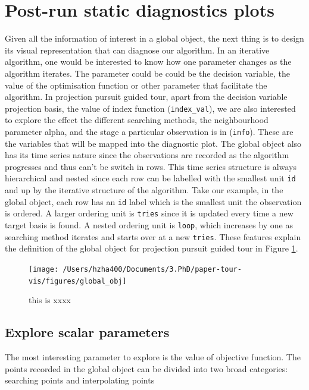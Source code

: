 \documentclass[12pt]{article}
\begin{document}
\hypertarget{post-run-static-diagnostics-plots}{%
\section{Post-run static diagnostics
plots}\label{post-run-static-diagnostics-plots}}

Given all the information of interest in a global object, the next thing
is to design its visual representation that can diagnose our algorithm.
In an iterative algorithm, one would be interested to know how one
parameter changes as the algorithm iterates. The parameter could be
could be the decision variable, the value of the optimisation function
or other parameter that facilitate the algorithm. In projection pursuit
guided tour, apart from the decision variable projection basis, the
value of index function (\texttt{index\_val}), we are also interested to
explore the effect the different searching methods, the neighbourhood
parameter alpha, and the stage a particular observation is in
(\texttt{info}). These are the variables that will be mapped into the
diagnostic plot. The global object also has its time series nature since
the observations are recorded as the algorithm progresses and thus can't
be switch in rows. This time series structure is always hierarchical and
nested since each row can be labelled with the smallest unit \texttt{id}
and up by the iterative structure of the algorithm. Take our example, in
the global object, each row has an \texttt{id} label which is the
smallest unit the observation is ordered. A larger ordering unit is
\texttt{tries} since it is updated every time a new target basis is
found. A nested ordering unit is \texttt{loop}, which increases by one
as searching method iterates and starts over at a new \texttt{tries}.
These features explain the definition of the global object for
projection pursuit guided tour in Figure \ref{fig:glb-obj}.

\begin{figure}
\texttt{[image: /Users/hzha400/Documents/3.PhD/paper-tour-vis/figures/global\_obj]} \caption{\label{glb-obj}this is xxxx}\label{fig:glb-obj}
\end{figure}

\hypertarget{explore-scalar-parameters}{%
\subsection{Explore scalar parameters}\label{explore-scalar-parameters}}

The most interesting parameter to explore is the value of objective
function. The points recorded in the global object can be divided into
two broad categories: searching points and interpolating points
\end{document}
